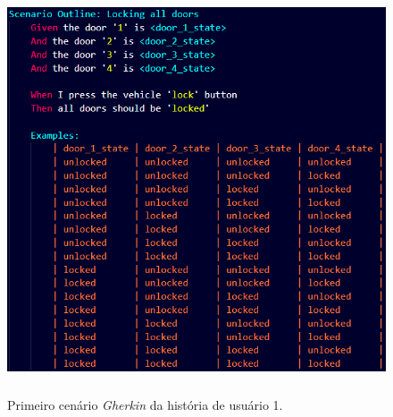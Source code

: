 
\begin{figure}[H]
\centering
\includegraphics[height=12cm]{figuras/cenarios/h1c1.png}
\caption{Primeiro cenário \textit{Gherkin} da história de usuário 1.}
\label{fig:h1c1}
\end{figure}

